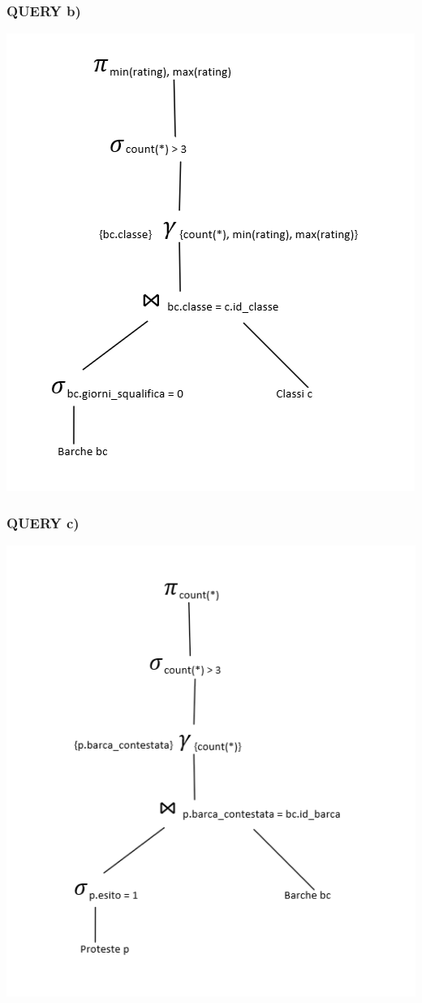\documentclass{article}
\begin{document}
\subsubsection{QUERY b)}
\includegraphics[]{logicob.png}

\subsubsection{QUERY c)}
\includegraphics[]{logicoc.png}
\end{document}
